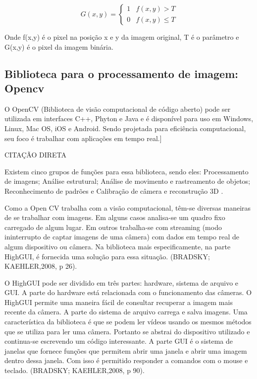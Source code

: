\documentclass[12pt]{article}
\begin{document}
	\begin{equation}
	G(x,y)=\begin{cases} 1 & f(x,y)>T \\ 
	
	0 & f(x,y)\le T \end{cases}
	\end{equation}
	
	Onde f(x,y) é o pixel na posição x e y da imagem original, T é o parâmetro e G(x,y) é o pixel da imagem binária.
	
	\subsection{Biblioteca para o processamento de imagem: Opencv}
	O OpenCV (Biblioteca de visão computacional de código aberto) pode ser utilizada em interfaces C++, Phyton e Java e é disponível para uso em Windows, Linux, Mac OS, iOS e Android. Sendo projetada para eficiência computacional, seu foco é trabalhar com aplicações em tempo real.]
	
	CITAÇÃO DIRETA
	
	Existem cinco grupos de funções para essa biblioteca, sendo eles: Processamento de imagens; Análise estrutural; Análise de movimento e rastreamento de objetos; Reconhecimento de padrões e Calibração de câmera e reconstrução 3D
	\citep{marengoni2009tutorial}.
	
	Como a Open CV trabalha com a visão computacional, têm-se diversas maneiras de se trabalhar com imagens. Em alguns casos analisa-se um quadro fixo carregado de algum lugar. Em outros trabalha-se com streaming (modo ininterrupto de captar imagens de uma câmera) com dados em tempo real de algum dispositivo ou câmera. Na biblioteca mais especificamente, na parte HighGUI, é fornecida uma solução para essa situação. (BRADSKY; KAEHLER,2008, p 26). 
	
	O HighGUI pode ser dividido em três partes: hardware, sistema de arquivo e GUI. A parte do hardware está relacionada com o funcionamento das câmeras. O HighGUI permite uma maneira fácil de consultar recuperar a imagem mais recente da câmera. A parte do sistema de arquivo carrega e salva imagens.  Uma característica da biblioteca é que se podem ler vídeos usando os mesmos métodos que se utiliza para ler uma câmera. Portanto se abstrai do dispositivo utilizado e continua-se escrevendo um código interessante. A parte GUI é o sistema de janelas que fornece funções que permitem abrir uma janela e abrir uma imagem dentro dessa janela. Com isso é permitido responder a comandos com o mouse e teclado. (BRADSKY; KAEHLER,2008, p 90).
	
\end{document}
